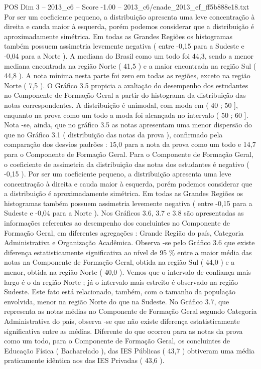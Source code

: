\begin{textsample}{POS Dim 3 – 2013\_c6 – Score -1.00 – 2013\_c6/enade\_2013\_ef\_ff5b888e18.txt}
Por ser um coeficiente pequeno, a distribuição apresenta uma leve concentração à direita e cauda maior à esquerda, porém podemos considerar que a distribuição é aproximadamente simétrica.
Em todas as Grandes Regiões os histogramas também possuem assimetria levemente negativa ( entre -0,15 para a Sudeste e -0,04 para a Norte ).
A mediana do Brasil como um todo foi 44,3, sendo a menor mediana encontrada na região Norte ( 41,5 ) e a maior encontrada na região Sul ( 44,8 ).
A nota mínima nesta parte foi zero em todas as regiões, exceto na região Norte ( 7,5 ).
O Gráfico 3.5 propicia a avaliação do desempenho dos estudantes no Componente de Formação Geral a partir do histograma da distribuição das notas correspondentes.
A distribuição é unimodal, com moda em ( 40 ; 50 ], enquanto na prova como um todo a moda foi alcançada no intervalo ( 50 ; 60 ].
Nota -se, ainda, que no gráfico 3.5 as notas apresentam uma menor dispersão do que no Gráfico 3.1 ( distribuição das notas da prova ), confirmado pela comparação dos desvios padrões : 15,0 para a nota da prova como um todo e 14,7 para o Componente de Formação Geral.
Para o Componente de Formação Geral, o coeficiente de assimetria da distribuição das notas dos estudantes é negativo ( -0,15 ).
Por ser um coeficiente pequeno, a distribuição apresenta uma leve concentração à direita e cauda maior à esquerda, porém podemos considerar que a distribuição é aproximadamente simétrica.
Em todas as Grandes Regiões os histogramas também possuem assimetria levemente negativa ( entre -0,15 para a Sudeste e -0,04 para a Norte ).
Nos Gráficos 3.6, 3.7 e 3.8 são apresentadas as informações referentes ao desempenho dos concluintes no Componente de Formação Geral, em diferentes agregações : Grande Região do país, Categoria Administrativa e Organização Acadêmica.
Observa -se pelo Gráfico 3.6 que existe diferença estatisticamente significativa ao nível de 95 \% entre a maior média das notas na Componente de Formação Geral, obtida na região Sul ( 44,0 ) e a menor, obtida na região Norte ( 40,0 ).
Vemos que o intervalo de confiança mais largo é o da região Norte ; já o intervalo mais estreito é observado na região Sudeste.
Este fato está relacionado, também, com o tamanho da população envolvida, menor na região Norte do que na Sudeste.
No Gráfico 3.7, que representa as notas médias no Componente de Formação Geral segundo Categoria Administrativa do país, observa -se que não existe diferença estatisticamente significativa entre as médias.
Diferente do que ocorreu para as notas da prova como um todo, para o Componente de Formação Geral, os concluintes de Educação Física ( Bacharelado ), das IES Públicas ( 43,7 ) obtiveram uma média praticamente idêntica aos das IES Privadas ( 43,6 ).

\end{textsample}
